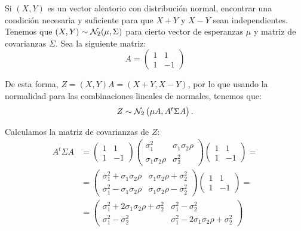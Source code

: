 \begin{ejercicio}
    Si $(X,Y)$ es un vector aleatorio con distribución normal, encontrar una condición necesaria y suficiente para que $X + Y$ y $X - Y$ sean independientes.\\

    Tenemos que $(X,Y)\sim \mathcal{N}_2(\mu,\Sigma)$ para cierto vector de esperanzas $\mu$ y matriz de covarianzas $\Sigma$.
    Sea la siguiente matriz:
    \begin{equation*}
        A=\begin{pmatrix}
            1 & 1\\
            1 & -1
        \end{pmatrix}
    \end{equation*}

    De esta forma, $Z=(X,Y)A=(X+Y,X-Y)$, por lo que usando la normalidad para las combinaciones lineales de normales, tenemos que:
    \begin{equation*}
        Z\sim \mathcal{N}_2\left(\mu A, A^t\Sigma A\right).
    \end{equation*}

    Calculamos la matriz de covarianzas de $Z$:
    \begin{align*}
        A^t\Sigma A &= \begin{pmatrix}
            1 & 1\\
            1 & -1
        \end{pmatrix}
        \begin{pmatrix}
            \sigma_1^2 & \sigma_1\sigma_2\rho \\
            \sigma_1\sigma_2\rho & \sigma_2^2
        \end{pmatrix}
        \begin{pmatrix}
            1 & 1\\
            1 & -1
        \end{pmatrix}
        =\\&= \begin{pmatrix}
            \sigma_1^2 + \sigma_1\sigma_2\rho & \sigma_1\sigma_2\rho + \sigma_2^2\\
            \sigma_1^2 - \sigma_1\sigma_2\rho & \sigma_1\sigma_2\rho - \sigma_2^2
        \end{pmatrix}
        \begin{pmatrix}
            1 & 1\\
            1 & -1
        \end{pmatrix}
        =\\&= \begin{pmatrix}
            \sigma_1^2 + 2\sigma_1\sigma_2\rho + \sigma_2^2 & \sigma_1^2 - \sigma_2^2\\
            \sigma_1^2 - \sigma_2^2 & \sigma_1^2 - 2\sigma_1\sigma_2\rho + \sigma_2^2
        \end{pmatrix}
    \end{align*}


\end{ejercicio}
